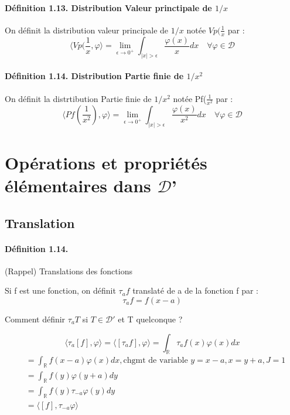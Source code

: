 \documentclass[12pt,a4paper]{report}
\newcommand{\ens}[1]{\ensuremath{\mathbb{#1}}}
\newcommand{\fphi}{\quad \forall \varphi \in \mathcal{D}}
\newcommand{\D}{\ensuremath{\mathcal{D}}}
\begin{document}
\paragraph{Définition 1.13. Distribution Valeur princtipale de \(1/x\)}

On définit la distribution valeur principale de \(1/x\) notée \(Vp(\frac{1}{x}\) par :
\[
	\langle Vp(\frac{1}{x}, \varphi \rangle = \lim_{\epsilon \rightarrow 0^+} \int_{\vert x \vert > \epsilon} \dfrac{\varphi(x)}{x}dx \fphi
\]

\paragraph{Définition 1.14. Distribution Partie finie de \(1/x^2\)}

On définit la distrtibution Partie finie de \(1/x^2\) notée Pf(\(\frac{1}{x^2}\) par :
\[
	\langle Pf\left(\frac{1}{x^2}\right), \varphi \rangle = \lim_{\epsilon \rightarrow 0^+} \int_{\vert x \vert > \epsilon} \dfrac{\varphi(x)}{x^2}dx \fphi
\]

\section{Opérations et propriétés élémentaires dans \D'}

\subsection{Translation}
\paragraph{Définition 1.14.} (Rappel) Translations des fonctions

Si f est une fonction, on définit \(\tau_af\) translaté de a de la fonction f par :
\[
	\tau_af = f(x - a)
\]

Comment définir \(\tau_a T\) si \(T \in \D'\) et T quelconque ?

\[
	\langle \tau_a [f], \varphi \rangle = \langle [\tau_a f], \varphi \rangle = \int_{\ens{R}} \tau_a f(x) \varphi(x) dx
\]
\begin{align*}
	&= \int_{\ens{R}} f(x-a) \varphi(x) dx, \text{chgmt de variable } y = x - a, x = y + a, J = 1\\
	&= \int_{\ens{R}} f(y) \varphi(y+a) dy\\
	&= \int_{\ens{R}} f(y) \tau_{-a} \varphi(y) dy\\
	&= \langle [f], \tau_{-a}\varphi \rangle
\end{align*}
\end{document}
